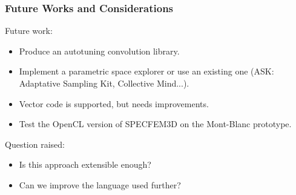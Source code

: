 \documentclass{beamer}
\begin{document}
\begin{frame}
\frametitle{Future Works and Considerations}
Future work:
\begin{itemize}
\item Produce an autotuning convolution library.
\item Implement a parametric space explorer or use an existing one (ASK: Adaptative Sampling Kit, Collective Mind...).
\item Vector code is supported, but needs improvements.
\item Test the OpenCL version of SPECFEM3D on the Mont-Blanc prototype.
\end{itemize}
Question raised:
\begin{itemize}
\item Is this approach extensible enough?
\item Can we improve the language used further?
\end{itemize}

\end{frame}
\end{document}
